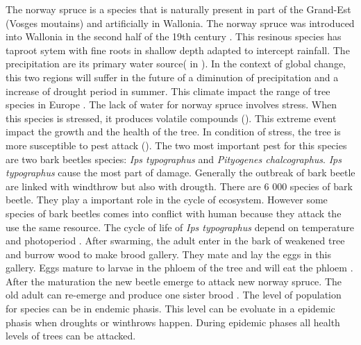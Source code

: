 \documentclass[3p,procedia]{elsarticle}
\begin{document}
The norway spruce is a species that is naturally present in part of the Grand-Est (Vosges moutains)  and artificially  in Wallonia. 
The norway spruce was introduced into Wallonia in the second half of the 19th century \citep{Noirfalise_1975}.
This resinous species has taproot sytem with fine roots in shallow depth adapted to intercept rainfall. 
The precipitation are its primary water source(\cite{weihe_1984} in \cite{tjoeker_biology_nodate}).
In the context of global change, this two regions will suffer in the future of a diminution of precipitation and a increase of drought period in summer. 
This climate impact the range of tree species in Europe  \citep{hanewinkel2013climate}.
The lack of water for norway spruce involves stress. When this species is stressed, it produces volatile compounds (\cite{netherer_interactions_2021}). %
This extreme event impact the growth and the health of the tree.
In condition of stress, the tree is more susceptible to pest attack (\cite{netherer_waterlimiting_2015}).
The two most important pest for this species are two  bark beetles species: \textit{Ips typographus} and \textit{Pityogenes chalcographus}. 
\textit{Ips typographus} cause the most part of damage. Generally the outbreak of bark beetle are linked with windthrow but also with drougth. 
There are 6 000 species of bark beetle. 
They play a important role in the cycle of ecosystem. 
However some species of bark beetles comes into conflict with human because they attack the use the same resource\citep{raffa_natural_2015}.%
The cycle of life of \textit{Ips typographus} depend on temperature and photoperiod \citep{baier_phenipscomprehensive_2007,annila_influence_1969}.
After swarming, the adult enter in the bark of weakened tree and burrow wood to make brood gallery.
They mate and lay the eggs in this gallery. 
Eggs mature to larvae in the phloem of the tree and will eat the phloem \citep{hlasny_bark_2021}.
After the maturation the new beetle emerge to attack new norway spruce.
The old adult can re-emerge and produce one sister brood \citep{zolubas_1995}.
The level of population for species can be in endemic phasis. 
This level can be evoluate in a epidemic phasis when droughts or winthrows happen. During epidemic phases all health levels of trees can be attacked. 
 
\end{document}
